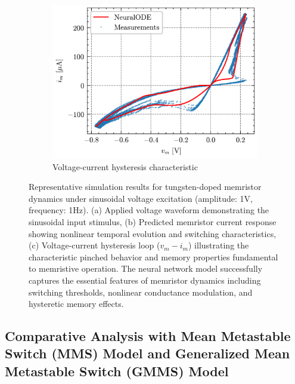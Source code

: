 \documentclass[11pt, oneside]{article}
\begin{document}
\begin{figure}[H]
\begin{subfigure}[b]{\subwidth}
        \includegraphics[width=\linewidth]{sample_results/hysteresis.png}
        \caption{Voltage-current hysteresis characteristic}
    \end{subfigure}
    \caption{Representative simulation results for tungsten-doped memristor dynamics under sinusoidal voltage excitation (amplitude: 1V, frequency: 1Hz). (a) Applied voltage waveform demonstrating the sinusoidal input stimulus, (b) Predicted memristor current response showing nonlinear temporal evolution and switching characteristics, (c) Voltage-current hysteresis loop ($v_m - i_m$) illustrating the characteristic pinched behavior and memory properties fundamental to memristive operation. The neural network model successfully captures the essential features of memristor dynamics including switching thresholds, nonlinear conductance modulation, and hysteretic memory effects.}
    \label{fig:sample-results}
\end{figure}



\clearpage

\subsection{Comparative Analysis with Mean Metastable Switch (MMS) Model and Generalized Mean Metastable Switch (GMMS) Model}
\end{document}
